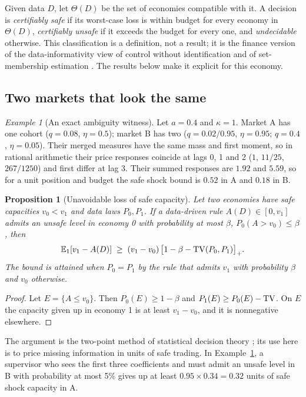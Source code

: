 \documentclass[12pt]{article}
\newtheorem{proposition}[theorem]{Proposition}
\theoremstyle{definition}
\theoremstyle{remark}
\newtheorem{example}[theorem]{Example}
\providecommand{\E}{\mathbb{E}}
\begin{document}
Given data $D$, let $\Theta(D)$ be the set of economies compatible with it. A decision is \emph{certifiably safe} if its worst-case loss is within budget for every economy in $\Theta(D)$, \emph{certifiably unsafe} if it exceeds the budget for every one, and \emph{undecidable} otherwise. This classification is a definition, not a result; it is the finance version of the data-informativity view of control without identification \citep{vanwaarde2020} and of set-membership estimation \citep{milanese1991}. The results below make it explicit for this economy.

\subsection{Two markets that look the same}

\begin{example}[An exact ambiguity witness]\label{ex:witness}
Let $a=0.4$ and $\kappa=1$. Market A has one cohort ($q=0.08$, $\eta=0.5$); market B has two ($q=0.02/0.95$, $\eta=0.95$; $q=0.4$, $\eta=0.05$). Their merged measures have the same mass and first moment, so in rational arithmetic their price responses coincide at lags 0, 1 and 2 ($1$, $11/25$, $267/1250$) and first differ at lag 3. Their summed responses are $1.92$ and $5.59$, so for a unit position and budget the safe shock bound is $0.52$ in A and $0.18$ in B.
\end{example}

\begin{proposition}[Unavoidable loss of safe capacity]\label{prop:twoworld}
Let two economies have safe capacities $v_0<v_1$ and data laws $P_0,P_1$. If a data-driven rule $A(D)\in[0,v_1]$ admits an unsafe level in economy 0 with probability at most $\beta$, $P_0(A>v_0)\le\beta$, then
\[
\E_1[v_1-A(D)]\;\ge\;(v_1-v_0)\,\bigl[1-\beta-{\rm TV}(P_0,P_1)\bigr]_+ .
\]
The bound is attained when $P_0=P_1$ by the rule that admits $v_1$ with probability $\beta$ and $v_0$ otherwise.
\end{proposition}

\begin{proof}
Let $E=\{A\le v_0\}$. Then $P_0(E)\ge1-\beta$ and $P_1(E)\ge P_0(E)-{\rm TV}$. On $E$ the capacity given up in economy 1 is at least $v_1-v_0$, and it is nonnegative elsewhere.
\end{proof}

The argument is the two-point method of statistical decision theory \citep{lecam1986}; its use here is to price missing information in units of safe trading. In Example~\ref{ex:witness}, a supervisor who sees the first three coefficients and must admit an unsafe level in B with probability at most 5\% gives up at least $0.95\times0.34=0.32$ units of safe shock capacity in A.
\end{document}
